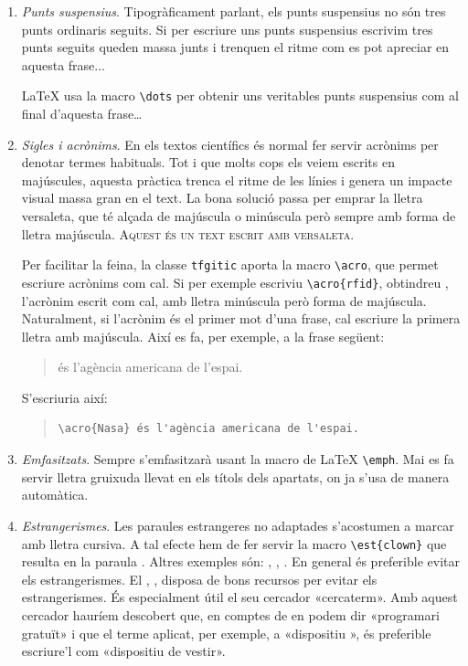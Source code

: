 \documentclass{tfgitic}
\begin{document}
\begin{enumerate}
\item \emph{Punts suspensius}. Tipogràficament parlant, els punts
  suspensius no són tres punts ordinaris seguits. Si per escriure uns
  punts suspensius escrivim tres punts seguits queden massa junts i
  trenquen el ritme com es pot apreciar en aquesta frase...

  \LaTeX{} usa la macro \verb!\dots! per obtenir uns veritables punts
  suspensius com al final d'aquesta frase\dots

\item \emph{Sigles i acrònims}. En els textos científics és normal fer
  servir acrònims per denotar termes habituals. Tot i que molts cops
  els veiem escrits en majúscules, aquesta pràctica trenca el ritme de
  les línies i genera un impacte visual massa gran en el text. La bona
  solució passa per emprar la lletra versaleta, que té alçada de
  majúscula o minúscula però sempre amb forma de lletra
  majúscula. \textsc{Aquest és un text escrit amb versaleta}.

  Per facilitar la feina, la classe \texttt{tfgitic} aporta la macro
  \verb!\acro!, que permet escriure acrònims com cal. Si per exemple
  escriviu \verb!\acro{rfid}!, obtindreu , l'acrònim escrit
  com cal, amb lletra minúscula però forma de majúscula. Naturalment,
  si l'acrònim és el primer mot d'una frase, cal escriure la primera
  lletra amb majúscula. Així es fa, per exemple, a la frase següent:
  \begin{quote}
     és l'agència americana de l'espai.
  \end{quote}
  S'escriuria així:
  \begin{quote}
\begin{verbatim}
\acro{Nasa} és l'agència americana de l'espai.
\end{verbatim}
  \end{quote}

\item \emph{Emfasitzats}. Sempre s'emfasitzarà usant la macro de
  \LaTeX{} \verb!\emph!. Mai es fa servir lletra gruixuda llevat en
  els títols dels apartats, on ja s'usa de manera automàtica.

\item \emph{Estrangerismes}. Les paraules estrangeres no adaptades
  s'acostumen a marcar amb lletra cursiva. A tal efecte hem de fer
  servir la macro \verb|\est{clown}| que resulta en la paraula
  . Altres exemples són: , ,
  . En general és preferible evitar els
  estrangerismes. El , \cite{termcat18:_web_termc},
  disposa de bons recursos per evitar els estrangerismes. És
  especialment útil el seu cercador «cercaterm». Amb aquest cercador
  hauríem descobert que, en comptes de  en podem dir
  «programari gratuït» i que el terme  aplicat, per
  exemple, a «dispositiu », és preferible escriure'l com
  «dispositiu de vestir».


\end{enumerate}
\end{document}
